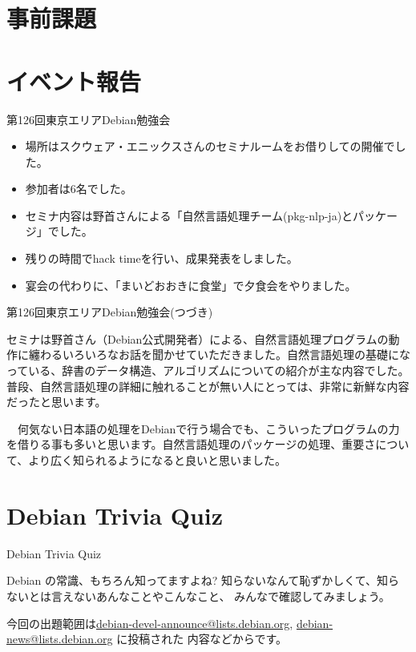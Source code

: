 \section{事前課題}
{\footnotesize

}

\section{イベント報告}

\begin{frame}{第126回東京エリアDebian勉強会}

\begin{itemize}
\item 場所はスクウェア・エニックスさんのセミナルームをお借りしての開催でした。
\item 参加者は6名でした。
\item セミナ内容は野首さんによる「自然言語処理チーム(pkg-nlp-ja)とパッケージ」でした。
\item 残りの時間でhack timeを行い、成果発表をしました。
\item 宴会の代わりに、「まいどおおきに食堂」で夕食会をやりました。
\end{itemize} 
  
\end{frame}

\begin{frame}{第126回東京エリアDebian勉強会(つづき)}

  セミナは野首さん（Debian公式開発者）による、自然言語処理プログラムの動作に纏わるいろいろなお話を聞かせていただきました。自然言語処理の基礎になっている、辞書のデータ構造、アルゴリズムについての紹介が主な内容でした。普段、自然言語処理の詳細に触れることが無い人にとっては、非常に新鮮な内容だったと思います。
  
　何気ない日本語の処理をDebianで行う場合でも、こういったプログラムの力を借りる事も多いと思います。自然言語処理のパッケージの処理、重要さについて、より広く知られるようになると良いと思いました。
  
\end{frame}

  
\section{Debian Trivia Quiz}
\begin{frame}{Debian Trivia Quiz}

  Debian の常識、もちろん知ってますよね?
知らないなんて恥ずかしくて、知らないとは言えないあんなことやこんなこと、
みんなで確認してみましょう。

今回の出題範囲は\url{debian-devel-announce@lists.debian.org},
\url{debian-news@lists.debian.org} に投稿された
内容などからです。

\end{frame}

